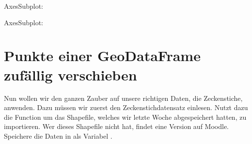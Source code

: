 \documentclass[letterpaper,10pt,english]{sphinxmanual}
\begin{document}
\begin{sphinxVerbatim}[commandchars=\\\{\}]
\PYGZlt{}AxesSubplot:\PYGZgt{}
\end{sphinxVerbatim}

\noindent{}

\begin{sphinxVerbatim}[commandchars=\\\{\}]
  \PYG{p}{[}     \PYG{p}{]}
     
\end{sphinxVerbatim}

\begin{sphinxVerbatim}[commandchars=\\\{\}]
\PYGZlt{}AxesSubplot:\PYGZgt{}
\end{sphinxVerbatim}

\noindent{}


\chapter{Punkte einer GeoDataFrame zufällig verschieben}
\label{\detokenize{02_05_Punkte_einer_GeoDataFrame_verschieben:punkte-einer-geodataframe-zufallig-verschieben}}\label{\detokenize{02_05_Punkte_einer_GeoDataFrame_verschieben::doc}}
Nun wollen wir den ganzen Zauber auf unsere richtigen Daten, die Zeckenstiche, anwenden. Dazu müssen wir zuerst den Zeckenstichdatensatz einlesen. Nutzt dazu die Function  um das Shapefile, welches wir letzte Woche abgespeichert hatten, zu importieren. Wer dieses Shapefile nicht hat, findet eine Version auf Moodle. Speichere die Daten in als Variabel .
\end{document}
